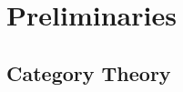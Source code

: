 \documentclass[12pt]{extarticle}
\begin{document}
    
\section{Preliminaries}
\subsection{Category Theory}
\end{document}
